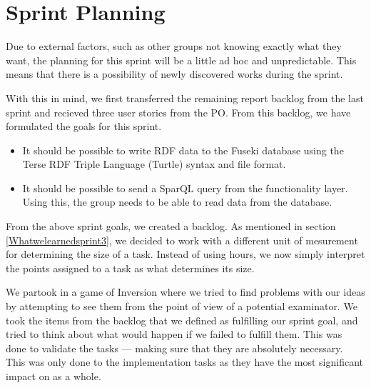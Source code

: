 \section{Sprint Planning}

Due to external factors, such as other groups not knowing exactly what they want, the planning for this sprint will be a little ad hoc and unpredictable.  
This means that there is a possibility of newly discovered works during the sprint.

With this in mind, we first transferred the remaining report backlog from the last sprint and recieved three user stories from the PO. 
From this backlog, we have formulated the goals for this sprint.

\begin{itemize}
    \item It should be possible to write RDF data to the Fuseki database using the Terse RDF Triple Language (Turtle) syntax and file format.
    \item It should be possible to send a SparQL query from the functionality layer. Using this, the group needs to be able to read data from the database.
\end{itemize}

From the above sprint goals, we created a backlog. As mentioned in section \ref{Whatwelearnedsprint3}, we decided to work with a different unit of mesurement for determining the size of a task.
Instead of using hours, we now simply interpret the points assigned to a task as what determines its size.

We partook in a game of Inversion  where we tried to find problems with our ideas by attempting to see them from the point of view of a potential examinator. 
We took the items from the backlog that we defined as fulfilling our sprint goal, and tried to think about what would happen if we failed to fulfill them. 
This was done to validate the tasks — making sure that they are absolutely necessary. 
This was only done to the implementation tasks as they have the most significant impact on \knox{} as a whole.

